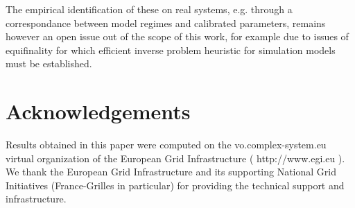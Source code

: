 \documentclass[11pt]{article}
\begin{document}
The empirical identification of these on real systems, e.g. through a correspondance between model regimes and calibrated parameters, remains however an open issue out of the scope of this work, for example due to issues of equifinality for which efficient inverse problem heuristic for simulation models must be established.






\section*{Acknowledgements}

Results obtained in this paper were computed on the vo.complex-system.eu virtual organization of the European Grid Infrastructure ( http://www.egi.eu ). We thank the European Grid Infrastructure and its supporting National Grid Initiatives (France-Grilles in particular) for providing the technical support and infrastructure.





\end{document}
